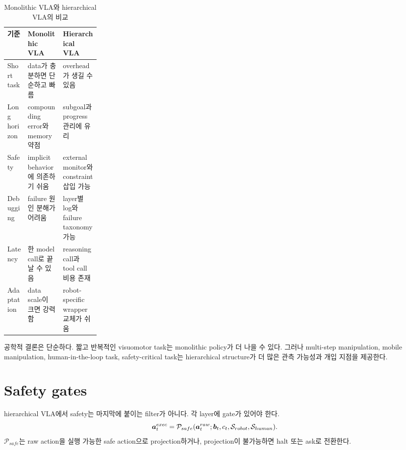 \begin{table}[h]
  \centering
  \caption{Monolithic VLA와 hierarchical VLA의 비교}
  \begin{tabularx}{\linewidth}{p{0.22\linewidth}X X}
    \toprule
    기준 & Monolithic VLA & Hierarchical VLA \\
    \midrule
    Short task & data가 충분하면 단순하고 빠름 & overhead가 생길 수 있음 \\
    Long horizon & compounding error와 memory 약점 & subgoal과 progress 관리에 유리 \\
    Safety & implicit behavior에 의존하기 쉬움 & external monitor와 constraint 삽입 가능 \\
    Debugging & failure 원인 분해가 어려움 & layer별 log와 failure taxonomy 가능 \\
    Latency & 한 model call로 끝날 수 있음 & reasoning call과 tool call 비용 존재 \\
    Adaptation & data scale이 크면 강력함 & robot-specific wrapper 교체가 쉬움 \\
    \bottomrule
  \end{tabularx}
  \label{tab:ch17-mono-hier}
\end{table}

공학적 결론은 단순하다. 짧고 반복적인 visuomotor task는 monolithic policy가 더 나을 수 있다. 그러나 multi-step manipulation, mobile manipulation, human-in-the-loop task, safety-critical task는 hierarchical structure가 더 많은 관측 가능성과 개입 지점을 제공한다.

\section{Safety gates}

hierarchical VLA에서 safety는 마지막에 붙이는 filter가 아니다. 각 layer에 gate가 있어야 한다.
\begin{equation}
  \bm{a}_t^{exec}
  =
  \mathcal{P}_{safe}
  (
  \bm{a}_t^{raw};
  \bm{b}_t,
  c_t,
  \mathcal{S}_{robot},
  \mathcal{S}_{human}
  ).
  \label{eq:ch17-safety-projection}
\end{equation}
$\mathcal{P}_{safe}$는 raw action을 실행 가능한 safe action으로 projection하거나, projection이 불가능하면 halt 또는 ask로 전환한다.


